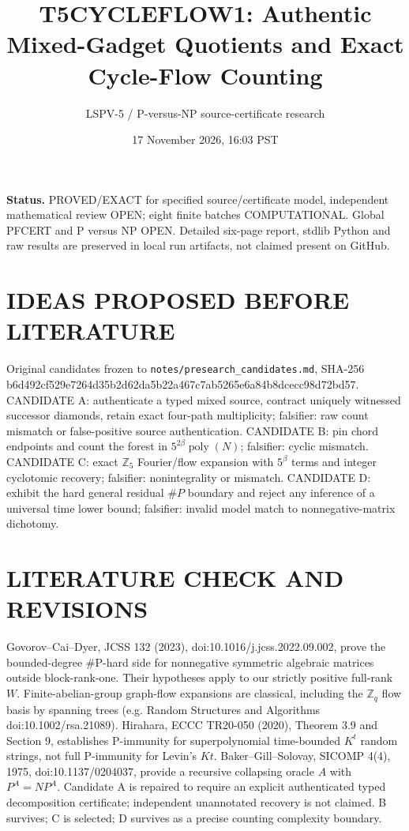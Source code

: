 \documentclass[11pt]{article}
\title{T5CYCLEFLOW1: Authentic Mixed-Gadget Quotients and Exact Cycle-Flow Counting}
\author{LSPV-5 / P-versus-NP source-certificate research}
\date{17 November 2026, 16:03 PST}
\begin{document}
\maketitle
\noindent\textbf{Status.} PROVED/EXACT for specified source/certificate model, independent mathematical review OPEN; eight finite batches COMPUTATIONAL. Global PFCERT and P versus NP OPEN. Detailed six-page report, stdlib Python and raw results are preserved in local run artifacts, not claimed present on GitHub.
\section{IDEAS PROPOSED BEFORE LITERATURE}
Original candidates frozen to \texttt{notes/presearch\_candidates.md}, SHA-256 b6d492cf529e7264d35b2d62da5b22a467c7ab5265e6a84b8dcecc98d72bd57. CANDIDATE A: authenticate a typed mixed source, contract uniquely witnessed successor diamonds, retain exact four-path multiplicity; falsifier: raw count mismatch or false-positive source authentication. CANDIDATE B: pin chord endpoints and count the forest in $5^{2\beta}\operatorname{poly}(N)$; falsifier: cyclic mismatch. CANDIDATE C: exact $\mathbb Z_5$ Fourier/flow expansion with $5^\beta$ terms and integer cyclotomic recovery; falsifier: nonintegrality or mismatch. CANDIDATE D: exhibit the hard general residual $\#P$ boundary and reject any inference of a universal time lower bound; falsifier: invalid model match to nonnegative-matrix dichotomy.
\section{LITERATURE CHECK AND REVISIONS}
Govorov--Cai--Dyer, JCSS 132 (2023), doi:10.1016/j.jcss.2022.09.002, prove the bounded-degree #P-hard side for nonnegative symmetric algebraic matrices outside block-rank-one. Their hypotheses apply to our strictly positive full-rank $W$. Finite-abelian-group graph-flow expansions are classical, including the $\mathbb Z_q$ flow basis by spanning trees (e.g. Random Structures and Algorithms doi:10.1002/rsa.21089). Hirahara, ECCC TR20-050 (2020), Theorem 3.9 and Section 9, establishes P-immunity for superpolynomial time-bounded $K^t$ random strings, not full P-immunity for Levin's $Kt$. Baker--Gill--Solovay, SICOMP 4(4), 1975, doi:10.1137/0204037, provide a recursive collapsing oracle $A$ with $P^A=NP^A$. Candidate A is repaired to require an explicit authenticated typed decomposition certificate; independent unannotated recovery is not claimed. B survives; C is selected; D survives as a precise counting complexity boundary.
\end{document}
